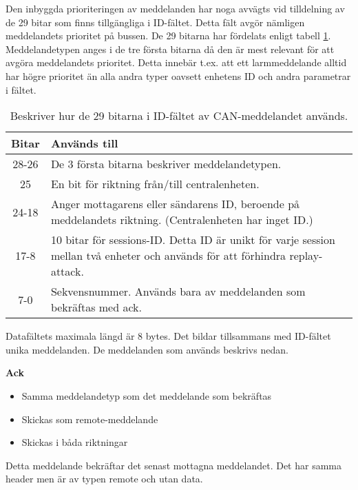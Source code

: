 Den inbyggda prioriteringen av meddelanden har noga avvägts vid tilldelning av de 29 bitar som finns tillgängliga i ID-fältet.
Detta fält avgör nämligen meddelandets prioritet på bussen.
De 29 bitarna har fördelats enligt tabell \ref{tab:idbitar}. Meddelandetypen anges i de tre första bitarna då den är mest relevant för att avgöra meddelandets prioritet. Detta innebär t.ex. att ett larmmeddelande alltid har högre prioritet än alla andra typer oavsett enhetens ID och andra parametrar i fältet.

\begin{table}[H]
	\centering
	\begin{tabular}{|c|p{}|}
		\hline
		Bitar 	& Används till \\ \hline \hline
		28-26		& De 3 första bitarna beskriver meddelandetypen. \\ \hline
		25		& En bit för riktning från/till centralenheten. \\ \hline
		24-18	& Anger mottagarens eller sändarens ID, beroende på meddelandets riktning. (Centralenheten har inget ID.) \\ \hline
		17-8 & 10 bitar för sessions-ID. Detta ID är unikt för varje session mellan två enheter och används för att förhindra replay-attack. \\ \hline
		7-0 & Sekvensnummer. Används bara av meddelanden som bekräftas med ack. \\ \hline

	\end{tabular}
	\caption{Beskriver hur de 29 bitarna i ID-fältet av CAN-meddelandet används.}
	\label{tab:idbitar}
\end{table}


Datafältets maximala längd är 8 bytes. Det bildar tillsammans med ID-fältet unika meddelanden. De meddelanden som används beskrivs nedan.



\textbf{Ack}
\begin{itemize}
	\item Samma meddelandetyp som det meddelande som bekräftas
    \item Skickas som remote-meddelande
    \item Skickas i båda riktningar
\end{itemize}
Detta meddelande bekräftar det senast mottagna meddelandet. Det har samma header men är av typen remote och utan data. \\


